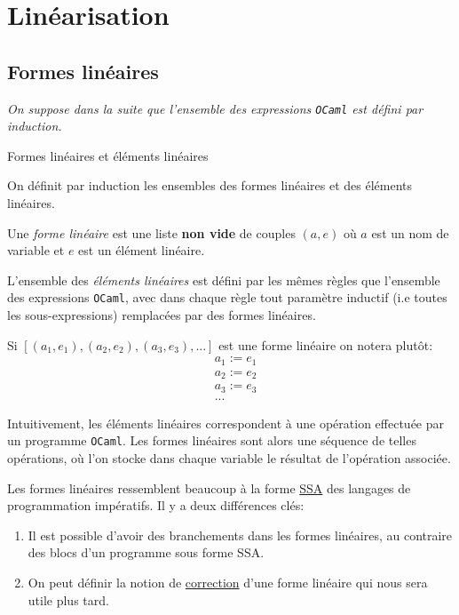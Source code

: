 \section{Linéarisation}

\subsection{Formes linéaires}

\textit{
    On suppose dans la suite que l'ensemble des expressions \texttt{OCaml} est
    défini par induction.
}

\begin{definition}
    Formes linéaires et éléments linéaires

    On définit par induction les ensembles des formes linéaires
    et des éléments linéaires.

    \medbreak

    Une \textit{forme linéaire} est une liste \textbf{non vide} de couples
    $(a, e)$ où $a$ est un nom de variable et $e$ est un élément linéaire.

    \medbreak

    L'ensemble des \textit{éléments linéaires} est défini par les mêmes règles
    que l'ensemble des expressions \texttt{OCaml}, avec dans chaque règle tout
    paramètre inductif (i.e toutes les sous-expressions) remplacées par des
    formes linéaires.
\end{definition}

Si $[(a_1, e_1), (a_2, e_2), (a_3, e_3), ...]$ est une forme linéaire on
notera plut\^ot:
\begin{align*}
     & a_1 := e_1 \\
     & a_2 := e_2 \\
     & a_3 := e_3 \\
     & ...
\end{align*}

\begin{remark}
    Intuitivement, les éléments linéaires correspondent à une opération
    effectuée par un programme \texttt{OCaml}. Les formes linéaires sont alors
    une séquence de telles opérations, où l'on stocke dans chaque variable le
    résultat de l'opération associée.
\end{remark}

\begin{remark}
    Les formes linéaires ressemblent beaucoup à la forme
    \href{https://en.wikipedia.org/wiki/Static_single-assignment_form}{SSA} des
    langages de programmation impératifs. Il y a deux différences clés:
    \begin{enumerate}
        \item Il est possible d'avoir des branchements dans les formes
              linéaires, au contraire des blocs d'un programme sous forme SSA.
        \item On peut définir la notion de
              \hyperref[definition_forme_lineaire_correcte]{correction} d'une
              forme linéaire qui nous sera utile plus tard.
    \end{enumerate}
\end{remark}

